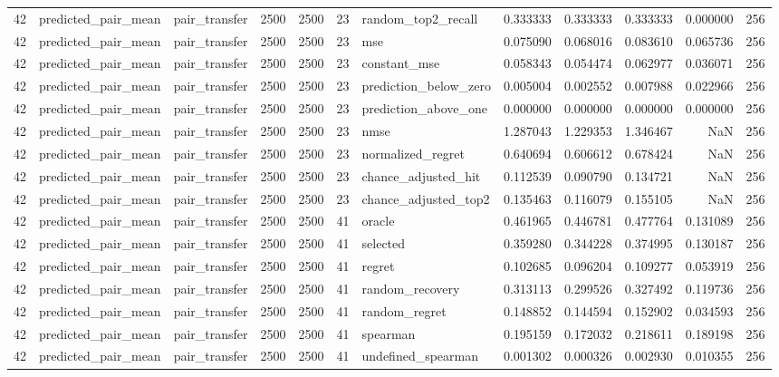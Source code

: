 \begin{tabular}{rllrrrlrrrrr}
42 & predicted_pair_mean & pair_transfer & 2500 & 2500 & 23 & random_top2_recall & 0.333333 & 0.333333 & 0.333333 & 0.000000 & 256 \\
42 & predicted_pair_mean & pair_transfer & 2500 & 2500 & 23 & mse & 0.075090 & 0.068016 & 0.083610 & 0.065736 & 256 \\
42 & predicted_pair_mean & pair_transfer & 2500 & 2500 & 23 & constant_mse & 0.058343 & 0.054474 & 0.062977 & 0.036071 & 256 \\
42 & predicted_pair_mean & pair_transfer & 2500 & 2500 & 23 & prediction_below_zero & 0.005004 & 0.002552 & 0.007988 & 0.022966 & 256 \\
42 & predicted_pair_mean & pair_transfer & 2500 & 2500 & 23 & prediction_above_one & 0.000000 & 0.000000 & 0.000000 & 0.000000 & 256 \\
42 & predicted_pair_mean & pair_transfer & 2500 & 2500 & 23 & nmse & 1.287043 & 1.229353 & 1.346467 & NaN & 256 \\
42 & predicted_pair_mean & pair_transfer & 2500 & 2500 & 23 & normalized_regret & 0.640694 & 0.606612 & 0.678424 & NaN & 256 \\
42 & predicted_pair_mean & pair_transfer & 2500 & 2500 & 23 & chance_adjusted_hit & 0.112539 & 0.090790 & 0.134721 & NaN & 256 \\
42 & predicted_pair_mean & pair_transfer & 2500 & 2500 & 23 & chance_adjusted_top2 & 0.135463 & 0.116079 & 0.155105 & NaN & 256 \\
42 & predicted_pair_mean & pair_transfer & 2500 & 2500 & 41 & oracle & 0.461965 & 0.446781 & 0.477764 & 0.131089 & 256 \\
42 & predicted_pair_mean & pair_transfer & 2500 & 2500 & 41 & selected & 0.359280 & 0.344228 & 0.374995 & 0.130187 & 256 \\
42 & predicted_pair_mean & pair_transfer & 2500 & 2500 & 41 & regret & 0.102685 & 0.096204 & 0.109277 & 0.053919 & 256 \\
42 & predicted_pair_mean & pair_transfer & 2500 & 2500 & 41 & random_recovery & 0.313113 & 0.299526 & 0.327492 & 0.119736 & 256 \\
42 & predicted_pair_mean & pair_transfer & 2500 & 2500 & 41 & random_regret & 0.148852 & 0.144594 & 0.152902 & 0.034593 & 256 \\
42 & predicted_pair_mean & pair_transfer & 2500 & 2500 & 41 & spearman & 0.195159 & 0.172032 & 0.218611 & 0.189198 & 256 \\
42 & predicted_pair_mean & pair_transfer & 2500 & 2500 & 41 & undefined_spearman & 0.001302 & 0.000326 & 0.002930 & 0.010355 & 256 \\

\end{tabular}
